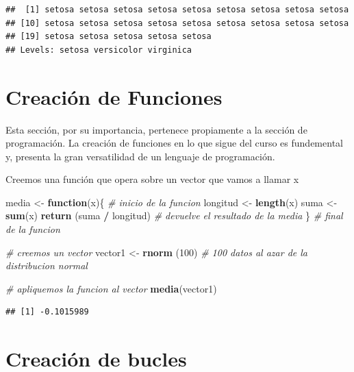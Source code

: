 \documentclass[
]{book}
\newenvironment{Shaded}{\begin{snugshade}}{\end{snugshade}}
\newcommand{\CommentTok}[1]{\textcolor[rgb]{0.56,0.35,0.01}{\textit{#1}}}
\newcommand{\ControlFlowTok}[1]{\textcolor[rgb]{0.13,0.29,0.53}{\textbf{#1}}}
\newcommand{\DecValTok}[1]{\textcolor[rgb]{0.00,0.00,0.81}{#1}}
\newcommand{\KeywordTok}[1]{\textcolor[rgb]{0.13,0.29,0.53}{\textbf{#1}}}
\newcommand{\NormalTok}[1]{#1}
\newcommand{\OperatorTok}[1]{\textcolor[rgb]{0.81,0.36,0.00}{\textbf{#1}}}
\newcommand{\StringTok}[1]{\textcolor[rgb]{0.31,0.60,0.02}{#1}}
\begin{document}
\begin{verbatim}
##  [1] setosa setosa setosa setosa setosa setosa setosa setosa setosa
## [10] setosa setosa setosa setosa setosa setosa setosa setosa setosa
## [19] setosa setosa setosa setosa setosa
## Levels: setosa versicolor virginica
\end{verbatim}

\hypertarget{creaciuxf3n-de-funciones}{%
\chapter{Creación de Funciones}\label{creaciuxf3n-de-funciones}}

Esta sección, por su importancia, pertenece propiamente a la sección de programación. La creación de funciones en lo que sigue del curso es fundemental y, presenta la gran versatilidad de un lenguaje de programación.

Creemos una función que opera sobre un vector que vamos a llamar x

\begin{Shaded}
\begin{Highlighting}[]
\NormalTok{media <-}\StringTok{ }\ControlFlowTok{function}\NormalTok{(x)\{     }\CommentTok{# inicio de la funcion}
\NormalTok{ longitud <-}\StringTok{ }\KeywordTok{length}\NormalTok{(x)}
\NormalTok{ suma <-}\StringTok{ }\KeywordTok{sum}\NormalTok{(x)}
 \KeywordTok{return}\NormalTok{ (suma }\OperatorTok{/}\StringTok{ }\NormalTok{longitud) }\CommentTok{# devuelve el resultado de la media}
\NormalTok{\}                         }\CommentTok{# final de la funcion}


\CommentTok{# creemos un vector}
\NormalTok{vector1 <-}\StringTok{ }\KeywordTok{rnorm}\NormalTok{ (}\DecValTok{100}\NormalTok{) }\CommentTok{# 100 datos al azar de la distribucion normal}

\CommentTok{# apliquemos la funcion al vector}
\KeywordTok{media}\NormalTok{(vector1)}
\end{Highlighting}
\end{Shaded}

\begin{verbatim}
## [1] -0.1015989
\end{verbatim}

\hypertarget{creaciuxf3n-de-bucles}{%
\chapter{Creación de bucles}\label{creaciuxf3n-de-bucles}}
\end{document}
